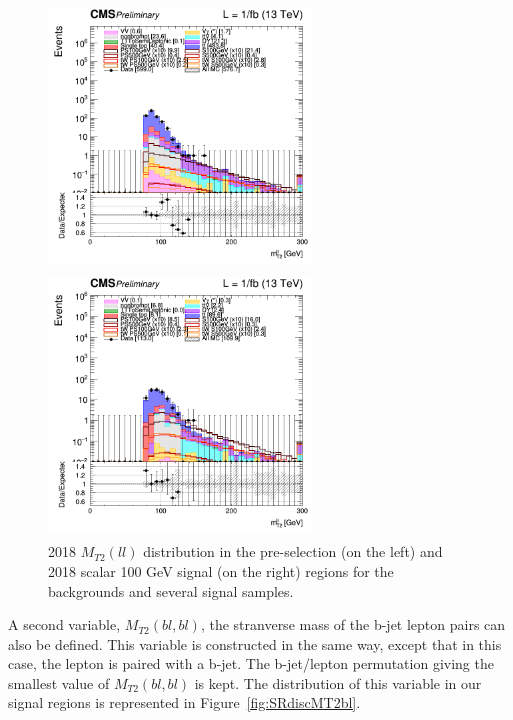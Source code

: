 \documentclass[a4paper, 10pt, openright]{report}
\begin{document}
\begin{figure}[htbp]
\centering
\begin{minipage}[b]{.48\textwidth}
\includegraphics[width=7cm, height=7cm]{figs/log_cratio_topCR_ll_mt2ll_2018.png}
\end{minipage}\hfill
\begin{minipage}[b]{.48\textwidth}
\includegraphics[width=7cm, height=7cm]{figs/log_cratio_topCR_ll_DNN_signal0_scalar100_mt2ll_2018.png}
\end{minipage} \hfill
\caption{2018 $M_{T2}(ll)$ distribution in the pre-selection (on the left) and 2018 scalar 100 GeV signal (on the right) regions for the backgrounds and several signal samples.}
\label{fig:SRdiscMT2}
\end{figure}

A second variable, $M_{T2}(bl, bl)$, the stranverse mass of the b-jet lepton pairs can also be defined. This variable is constructed in the same way, except that in this case, the lepton is paired with a b-jet. The b-jet/lepton permutation giving the smallest value of $M_{T2}(bl, bl)$ is kept. The distribution of this variable in our signal regions is represented in Figure~\ref{fig:SRdiscMT2bl}.
\end{document}
